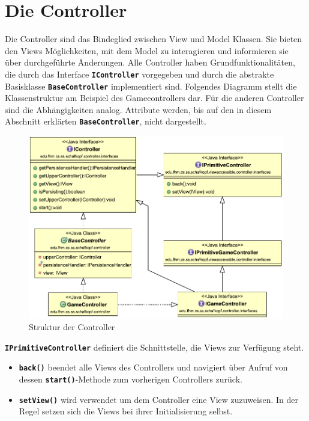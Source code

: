 \documentclass[
							a4paper, 
							11pt, 
							openany, 
							liststotoc,
							parskip=half, 
   							headings=normal
						]{scrreprt}
\begin{document}
{\clearpage

\section{Die Controller} \label{se:anwendung_controller}
Die Controller sind das Bindeglied zwischen View und Model Klassen. 
Sie bieten den Views Möglichkeiten, mit dem Model zu interagieren und informieren sie über durchgeführte Änderungen. Alle Controller haben Grundfunktionalitäten, die durch das Interface \textbf{\texttt{IController}} vorgegeben und durch die abstrakte Basisklasse \textbf{\texttt{BaseController}} implementiert sind.
Folgendes Diagramm stellt die Klassenstruktur am Beispiel des Gamecontrollers dar. Für die anderen Controller sind die Abhängigkeiten analog. Attribute werden, bis auf den in diesem Abschnitt erklärten \textbf{\texttt{BaseController}}, nicht dargestellt.

\begin{figure}[H]
\begin{center}
    \includegraphics[width=1.0\textwidth]{./pictures/uml/class_diagram/uml_class_controller.pdf}
	\caption[Anwendung/Controller -- Struktur der Controller]{Struktur der Controller} \label{fig:controller_base}
\end{center}
\end{figure}

\textbf{\texttt{IPrimitiveController}} definiert die Schnittstelle, die Views zur Verfügung steht.
\begin{itemize}
	\item \textbf{\texttt{back()}} beendet alle Views des Controllers und navigiert über Aufruf von dessen \textbf{\texttt{start()}}-Methode zum vorherigen Controllers zurück.
	\item \textbf{\texttt{setView()}} wird verwendet um dem Controller eine View zuzuweisen. In der Regel setzen sich die Views bei ihrer Initialisierung selbst.
\end{itemize}\bigskip

}
\end{document}

